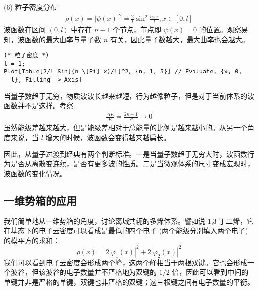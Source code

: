 (6) 粒子密度分布
\begin{eqnarray}
    \rho(x) = |\psi(x)|^2 = \frac 2l \sin^2 \frac{n\pi x}l, x\in[0,l]
\end{eqnarray}
波函数在区间 $(0,l)$ 中存在 $n-1$ 个节点，节点即 $\psi(x) = 0$ 的位置。观察易知，波函数的最大曲率与量子数 $n$ 有关，因此量子数越大，最大曲率也会越大。
\begin{lstlisting}
(* 粒子密度 *)
l = 1;
Plot[Table[2/l Sin[(n \[Pi] x)/l]^2, {n, 1, 5}] // Evaluate, {x, 0, 
  l}, Filling -> Axis]
\end{lstlisting}
当量子数趋于无穷，物质波波长越来越短，行为越像粒子，但是对于当前体系的波函数并不是这样。考察
\begin{eqnarray}
    \frac{\Delta E}{E} = \frac{2n+1}{n^2} \rightarrow 0
\end{eqnarray}
虽然能级差越来越大，但是能级差相对于总能量的比例是越来越小的。从另一个角度来说，当 $l$ 增大的时候，波函数会变得越来越扁长。

因此，从量子过渡到经典有两个判断标准。一是当量子数趋于无穷大时，波函数行为是否从离散变连续，是否有更多波的性质。二是当微观体系的尺寸变成宏观时，波函数的变化情况。


\subsection{一维势箱的应用}
我们简单地从一维势箱的角度，讨论离域共轭的多烯体系。譬如说 1,3-丁二烯，它在基态下的电子云密度可以看成是最低的四个电子 (两个能级分别填入两个电子) 的模平方的求和：
\begin{equation}
  \rho (x) = 2 |\varphi_1 (x)|^2 + 2 |\varphi_2 (x)|^2
\end{equation}
我们可以看到电子云密度会形成两个峰，这两个峰相当于两根双键。它也会形成一个波谷，但该波谷的电子数量并不严格地为双键的 $1/2$ 倍，因此可以看到中间的单键并非是严格的单键，双键也非严格的双键；这三根键之间有电子数量的平衡。

